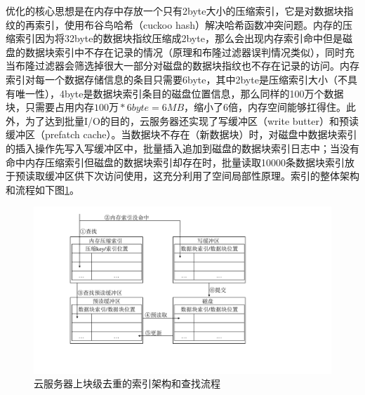 \documentclass[promaster]{thesis-uestc}
\begin{document}
优化的核心思想是在内存中存放一个只有2byte大小的压缩索引，它是对数据块指纹的再索引，使用布谷鸟哈希（cuckoo hash）解决哈希函数冲突问题。内存的压缩索引因为将32byte的数据块指纹压缩成2byte，那么会出现内存索引命中但是磁盘的数据块索引中不存在记录的情况（原理和布隆过滤器误判情况类似），同时充当布隆过滤器会筛选掉很大一部分对磁盘的数据块指纹也不存在记录的访问。内存索引对每一个数据存储信息的条目只需要6byte，其中2byte是压缩索引大小（不具有唯一性），4byte是数据块索引条目的磁盘位置信息，那么同样的100万个数据块，只需要占用内存$100万 * 6byte = 6MB$，缩小了6倍，内存空间能够扛得住。此外，为了达到批量I/O的目的，云服务器还实现了写缓冲区（write butter）和预读缓冲区（prefatch cache）。当数据块不存在（新数据块）时，对磁盘中数据块索引的插入操作先写入写缓冲区中，批量插入追加到磁盘的数据块索引日志中；当没有命中内存压缩索引但磁盘的数据块索引却存在时，批量读取10000条数据块索引放于预读取缓冲区供下次访问使用，这充分利用了空间局部性原理。索引的整体架构和流程如下图\ref{云服务器上块级去重的索引架构和查找流程}。

\begin{figure}[htbp]
    \centering
    \includegraphics[width = 0.8\linewidth]{pic/云服务器上块级重删的索引架构和查找流程.pdf}
    \caption{云服务器上块级去重的索引架构和查找流程}
    \label{云服务器上块级去重的索引架构和查找流程}
\end{figure}
\end{document}
